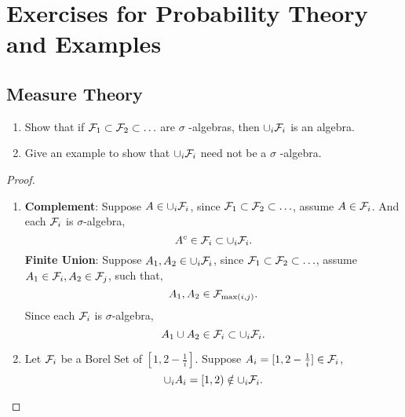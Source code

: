 \chapter{Exercises for Probability Theory and Examples}

\section{Measure Theory}

\begin{exercise}
	\begin{enumerate}
		\item Show that if ${\mathcal F}_{1}\subset {\mathcal F}_{2}\subset\ldots$ are $\sigma$ -algebras, then $\cup_{i}{\mathcal F}_{i}$ is an algebra.
		\item Give an example to show that $\cup_{i}{\mathcal F}_{i}$ need not be a $\sigma$ -algebra.
	\end{enumerate}
\end{exercise}

\begin{proof}
	\begin{enumerate}
		\item
		      \textbf{Complement}: Suppose $A\in\cup_{i}{\mathcal F}_{i}$, since ${\mathcal F}_{1}\subset {\mathcal F}_{2}\subset\ldots$, assume $A\in{\mathcal F}_{i}$. And each ${\mathcal F}_{i}$ is $\sigma$-algebra,
		      \begin{equation*}
			      A^c\in{\mathcal F}_{i}\subset\cup_{i}{\mathcal F}_{i}.
		      \end{equation*}
		      \textbf{Finite Union}: Suppose $A_1,A_2\in\cup_{i}{\mathcal F}_{i}$, since ${\mathcal F}_{1}\subset {\mathcal F}_{2}\subset\ldots$, assume $A_1\in{\mathcal F}_{i},A_2\in{\mathcal F}_{j}$, such that,
		      \begin{equation*}
			      A_1,A_2\in{\mathcal F}_{\max(i,j)}.
		      \end{equation*}
		      Since each ${\mathcal F}_{i}$ is $\sigma$-algebra,
		      \begin{equation*}
			      A_1\cup A_2\in{\mathcal F}_{i}\subset\cup_{i}{\mathcal F}_{i}.
		      \end{equation*}
		\item
		      Let ${\mathcal F}_{i}$ be a Borel Set of $[1,2-\frac{1}{i}]$. Suppose $A_i=[1,2-\frac{1}{i}]\in{\mathcal F}_{i}$,
		      \begin{equation*}
			      \cup_{i}A_{i}=[1,2)\notin\cup_{i}{\mathcal F}_{i}.
		      \end{equation*}
	\end{enumerate}
\end{proof}

